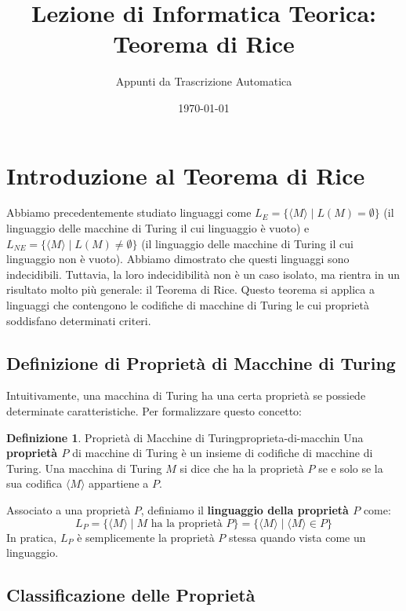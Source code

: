 \documentclass[a4paper]{article}
\title{Lezione di Informatica Teorica: Teorema di Rice}
\author{Appunti da Trascrizione Automatica}
\date{\today}
\theoremstyle{definition} %
\newtheorem{definition}[theorem]{Definizione}
\begin{document}
\maketitle
\tableofcontents
\newpage

\section{Introduzione al Teorema di Rice}

Abbiamo precedentemente studiato linguaggi come $L_E = \{\langle M \rangle \mid L(M) = \emptyset\}$ (il linguaggio delle macchine di Turing il cui linguaggio è vuoto) e $L_{NE} = \{\langle M \rangle \mid L(M) \neq \emptyset\}$ (il linguaggio delle macchine di Turing il cui linguaggio non è vuoto). Abbiamo dimostrato che questi linguaggi sono indecidibili. Tuttavia, la loro indecidibilità non è un caso isolato, ma rientra in un risultato molto più generale: il Teorema di Rice. Questo teorema si applica a linguaggi che contengono le codifiche di macchine di Turing le cui proprietà soddisfano determinati criteri.

\subsection{Definizione di Proprietà di Macchine di Turing}

Intuitivamente, una macchina di Turing ha una certa proprietà se possiede determinate caratteristiche. Per formalizzare questo concetto:

\begin{definition}{Proprietà di Macchine di Turing}{proprieta-di-macchin}
Una \textbf{proprietà $P$} di macchine di Turing è un insieme di codifiche di macchine di Turing.
Una macchina di Turing $M$ si dice che ha la proprietà $P$ se e solo se la sua codifica $\langle M \rangle$ appartiene a $P$.
\end{definition}

Associato a una proprietà $P$, definiamo il \textbf{linguaggio della proprietà $P$} come:
\[ L_P = \{ \langle M \rangle \mid M \text{ ha la proprietà } P \} = \{ \langle M \rangle \mid \langle M \rangle \in P \} \]
In pratica, $L_P$ è semplicemente la proprietà $P$ stessa quando vista come un linguaggio.

\subsection{Classificazione delle Proprietà}
\end{document}
